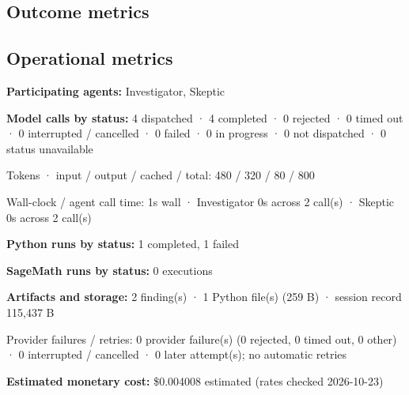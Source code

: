 \documentclass[11pt]{article}
\begin{document}
\subsection{Outcome metrics}
\subsection{Operational metrics}
\textbf{Participating agents:} Investigator, Skeptic\par
\textbf{Model calls by status:} 4 dispatched · 4 completed · 0 rejected · 0 timed out · 0 interrupted / cancelled · 0 failed · 0 in progress · 0 not dispatched · 0 status unavailable\par
Tokens · input / output / cached / total: 480 / 320 / 80 / 800\par
Wall-clock / agent call time: 1s wall · Investigator 0s across 2 call(s) · Skeptic 0s across 2 call(s)\par
\textbf{Python runs by status:} 1 completed, 1 failed\par
\textbf{SageMath runs by status:} 0 executions\par
\textbf{Artifacts and storage:} 2 finding(s) · 1 Python file(s) (259 B) · session record 115,437 B\par
Provider failures / retries: 0 provider failure(s) (0 rejected, 0 timed out, 0 other) · 0 interrupted / cancelled · 0 later attempt(s); no automatic retries\par
\textbf{Estimated monetary cost:} \$0.004008 estimated (rates checked 2026-10-23)\par
\end{document}

